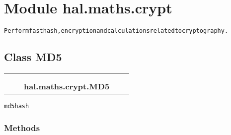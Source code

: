 %
%
%


\section{Module hal.maths.crypt}

    \label{hal:maths:crypt}
\begin{alltt}
Perform fast hash, encryption and calculations related to cryptography. 
\end{alltt}



\subsection{Class MD5}

    \label{hal:maths:crypt:MD5}
\begin{tabular}{cccccc}
\multicolumn{2}{r}{\settowidth{\BCL}{object}\multirow{2}{\BCL}{object}}
&&
  \\\cline{3-3}
  &&\multicolumn{1}{c|}{}
&&
  \\
&&\multicolumn{2}{l}{\textbf{hal.maths.crypt.MD5}}
\end{tabular}

\begin{alltt}
md5 hash 
\end{alltt}



  \subsubsection{Methods}

